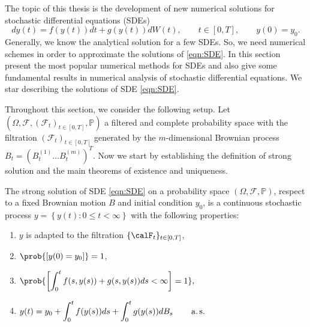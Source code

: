 
	The topic of this thesis is the development of new numerical solutions for stochastic differential equations (SDEs)
\begin{equation}\label{eqn:SDE}
	dy(t) = f(y(t))dt + g(y(t))dW(t), \qquad t\in [0,T], \qquad y(0)=y_0 .
\end{equation}
	Generally, we know the analytical solution for a few SDEs.
So, we need numerical schemes in order to approximate the solutions of \cref{eqn:SDE}. In this section present  the 
most popular numerical methods for SDEs and also give some fundamental results in numerical analysis of stochastic  
differential equations. We star describing the solutions of SDE \eqref{eqn:SDE}.
	
	Throughout  this  section, we consider the following setup. Let 
$(\Omega,\mathcal{F},(\mathcal{F}_t)_{t\in[0,T]},\mathbb{P})$  a filtered and complete probability space with
the filtration $(\mathcal{F}_t)_{t\in[0,T]}$ generated by the $m$-dimensional Brownian process 
$B_t=( B_t^{(1)}\ldots B_t^{(m)})^T$.
Now we  start by establishing the definition of strong solution and the main theorems of  existence and  uniqueness.

\begin{definition}
	The strong solution of  SDE \eqref{eqn:SDE} on a probability space $(\Omega,\mathcal{F},\mathbb{P})$,
	respect to a fixed Brownian motion $B$ and initial condition $y_0$,
	is a continuous stochastic process $y=\left\{ y(t): 0\leq t<\infty\right\} $
	with the following properties:
	\begin{enumerate}[(SS-1)]
		\item \label{eq:SF1}
			$y$ is adapted to the filtration $\{\calF_{t}\}_{t\in[0,T]}$,
		\item \label{eq:SF2}
			$\prob{[y(0)=y_0]}=1$,
		\item \label{eq:SF3}
		$\displaystyle \prob{\left[\int_{0}^{t}f(s,y(s))+g(s,y(s))ds<\infty\right]=1},$
		\item \label{eq:SF4}
		$
		\displaystyle
			y(t)=y_0+\int_{0}^{t} f(y(s))ds+
		\int_{0}^{t} g(y(s))dB_s
		\qquad \operatorname*{a.s.}
		$
	\end{enumerate}
\end{definition}
	
